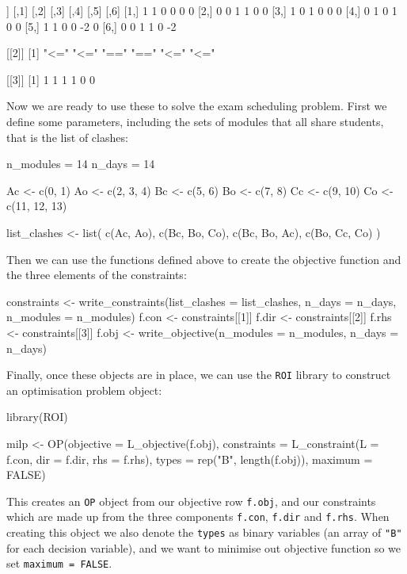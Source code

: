\begin{Rout}
[[1]]
     [,1] [,2] [,3] [,4] [,5] [,6]
[1,]    1    1    0    0    0    0
[2,]    0    0    1    1    0    0
[3,]    1    0    1    0    0    0
[4,]    0    1    0    1    0    0
[5,]    1    1    0    0   -2    0
[6,]    0    0    1    1    0   -2

[[2]]
[1] "<=" "<=" "==" "==" "<=" "<="

[[3]]
[1] 1 1 1 1 0 0
\end{Rout}

Now we are ready to use these to solve the exam scheduling problem.
First we define some parameters, including the sets of modules that all share
students, that is the list of clashes:

\begin{Rin}
n_modules = 14
n_days = 14

Ac <- c(0, 1)
Ao <- c(2, 3, 4)
Bc <- c(5, 6)
Bo <- c(7, 8)
Cc <- c(9, 10)
Co <- c(11, 12, 13)

list_clashes <- list(
  c(Ac, Ao),
  c(Bc, Bo, Co),
  c(Bc, Bo, Ac),
  c(Bo, Cc, Co)
)
\end{Rin}

Then we can use the functions defined above to create the objective function and
the three elements of the constraints:

\begin{Rin}
constraints <- write_constraints(list_clashes = list_clashes,
                                 n_days = n_days,
                                 n_modules = n_modules)
f.con <- constraints[[1]]
f.dir <- constraints[[2]]
f.rhs <- constraints[[3]]
f.obj <- write_objective(n_modules = n_modules, n_days = n_days)
\end{Rin}

Finally, once these objects are in place, we can use the
\texttt{ROI} library to construct an optimisation problem object:

\begin{Rin}
library(ROI)

milp <- OP(objective = L_objective(f.obj),
           constraints = L_constraint(L = f.con,
                                      dir = f.dir,
                                      rhs = f.rhs),
           types = rep("B", length(f.obj)), 
           maximum = FALSE)
\end{Rin}

This creates an \texttt{OP} object from our objective row
\texttt{f.obj}, and our constraints which are made up from the three
components \texttt{f.con}, \texttt{f.dir} and
\texttt{f.rhs}.
When creating this object we also denote the \texttt{types} as binary
variables (an array of \texttt{"B"} for each decision variable), and we
want to minimise out objective function so we set
\texttt{maximum = FALSE}.

